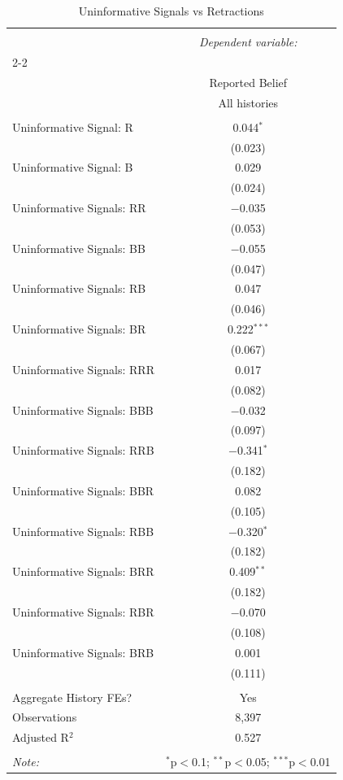 
\begin{table}[!htbp] \centering 
  \caption{Uninformative Signals vs Retractions} 
  \label{} 
\begin{tabular}{@{\extracolsep{5pt}}lc} 
\\[-1.8ex]\hline 
\hline \\[-1.8ex] 
 & \multicolumn{1}{c}{\textit{Dependent variable:}} \\ 
\cline{2-2} 
\\[-1.8ex] & Reported Belief \\ 
 & All histories \\ 
\hline \\[-1.8ex] 
 Uninformative Signal: R & 0.044$^{*}$ \\ 
  & (0.023) \\ 
  Uninformative Signal: B & 0.029 \\ 
  & (0.024) \\ 
  Uninformative Signals: RR & $-$0.035 \\ 
  & (0.053) \\ 
  Uninformative Signals: BB & $-$0.055 \\ 
  & (0.047) \\ 
  Uninformative Signals: RB & 0.047 \\ 
  & (0.046) \\ 
  Uninformative Signals: BR & 0.222$^{***}$ \\ 
  & (0.067) \\ 
  Uninformative Signals: RRR & 0.017 \\ 
  & (0.082) \\ 
  Uninformative Signals: BBB & $-$0.032 \\ 
  & (0.097) \\ 
  Uninformative Signals: RRB & $-$0.341$^{*}$ \\ 
  & (0.182) \\ 
  Uninformative Signals: BBR & 0.082 \\ 
  & (0.105) \\ 
  Uninformative Signals: RBB & $-$0.320$^{*}$ \\ 
  & (0.182) \\ 
  Uninformative Signals: BRR & 0.409$^{**}$ \\ 
  & (0.182) \\ 
  Uninformative Signals: RBR & $-$0.070 \\ 
  & (0.108) \\ 
  Uninformative Signals: BRB & 0.001 \\ 
  & (0.111) \\ 
 \hline \\[-1.8ex] 
Aggregate History FEs? & Yes \\ 
Observations & 8,397 \\ 
Adjusted R$^{2}$ & 0.527 \\ 
\hline 
\hline \\[-1.8ex] 
\textit{Note:}  & \multicolumn{1}{r}{$^{*}$p$<$0.1; $^{**}$p$<$0.05; $^{***}$p$<$0.01} \\ 
\end{tabular} 
\end{table} 
